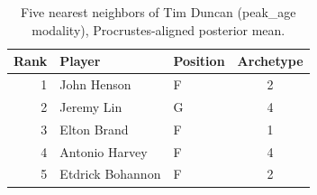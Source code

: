 \begin{table}[htbp]
  \centering\small
  \begin{tabular}{rllc}
    \toprule
    Rank & Player & Position & Archetype \\
    \midrule
    1 & John Henson & F & 2 \\
    2 & Jeremy Lin & G & 4 \\
    3 & Elton Brand & F & 1 \\
    4 & Antonio Harvey & F & 4 \\
    5 & Etdrick Bohannon & F & 2 \\
    \bottomrule
  \end{tabular}
  \caption{Five nearest neighbors of Tim Duncan (peak_age modality), Procrustes-aligned posterior mean.}
  \label{tab:Tim_Duncan_neighbors_peak_age}
\end{table}

